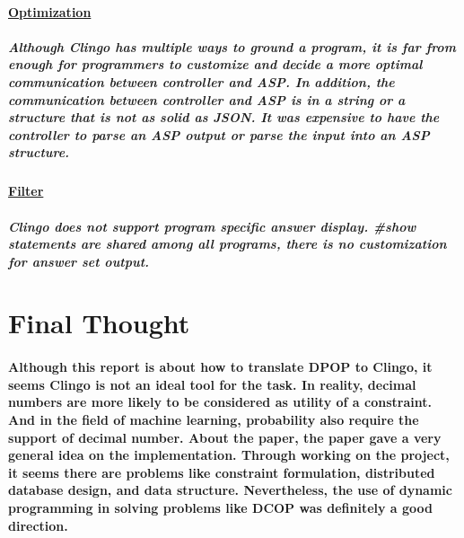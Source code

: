 \documentclass{article}
\begin{document}
	\paragraph{\underline{Optimization}}
	\subparagraph{Although Clingo has multiple ways to ground a program, it is far from enough for programmers to customize and decide a more optimal communication between controller and ASP. In addition, the communication between controller and ASP is in a string or a structure that is not as solid as JSON. It was expensive to have the controller to parse an ASP output or parse the input into an ASP structure.}
	\paragraph{\underline{Filter}}
	\subparagraph{Clingo does not support program specific answer display. \#show statements are shared among all programs, there is no customization for answer set output.}
	\section{Final Thought}
	\paragraph{Although this report is about how to translate DPOP to Clingo, it seems Clingo is not an ideal tool for the task. In reality, decimal numbers are more likely to be considered as utility of a constraint. And in the field of machine learning, probability also require the support of decimal number. About the paper, the paper gave a very general idea on the implementation. Through working on the project, it seems there are problems like constraint formulation, distributed database design, and data structure. Nevertheless, the use of dynamic programming in solving problems like DCOP was definitely a good direction.}
\end{document}

